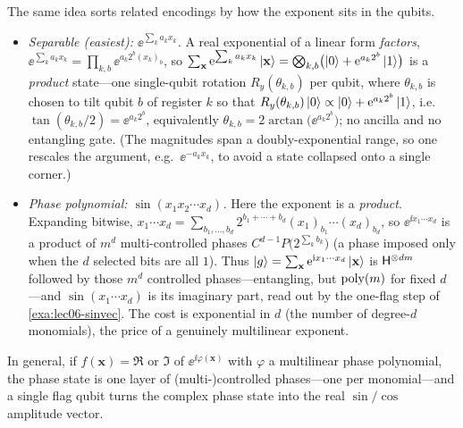 \begin{remark}
\label{rem:lec06-phasepoly}
The same idea sorts related encodings by how the exponent sits in the qubits.
\begin{itemize}[leftmargin=1.4em,nosep]
  \item \emph{Separable (easiest): $\ee^{\sum_k a_k x_k}$.} A real exponential of a
        linear form \emph{factors},
        $\ee^{\sum_k a_k x_k}=\prod_{k,b}\ee^{a_k 2^b (x_k)_b}$, so
        $\sum_{\mathbf x}\mathrm{e}^{\sum_k a_k x_k}\ket{\mathbf x}
        =\bigotimes_{k,b}\bigl(\ket0+\mathrm{e}^{a_k 2^b}\ket1\bigr)$ is a \emph{product}
        state---one single-qubit rotation $R_y(\theta_{k,b})$ per qubit, where
        $\theta_{k,b}$ is chosen to tilt qubit $b$ of register $k$ so that
        $R_y(\theta_{k,b})\ket0\propto\ket0+\mathrm{e}^{a_k 2^b}\ket1$, i.e.\
        $\tan(\theta_{k,b}/2)=\ee^{a_k 2^b}$, equivalently
        $\theta_{k,b}=2\arctan\!\bigl(\ee^{a_k 2^b}\bigr)$; no ancilla and no entangling
        gate. (The magnitudes span a
        doubly-exponential range, so one rescales the argument, e.g.\
        $\ee^{-a_k x_k}$, to avoid a state collapsed onto a single corner.)
  \item \emph{Phase polynomial: $\sin(x_1x_2\cdots x_d)$.} Here the exponent is a
        \emph{product}. Expanding bitwise,
        $x_1\cdots x_d=\sum_{b_1,\dots,b_d}2^{b_1+\cdots+b_d}(x_1)_{b_1}\cdots(x_d)_{b_d}$,
        so $\ee^{\ii x_1\cdots x_d}$ is a product of $m^d$ multi-controlled phases
        $C^{d-1}P\bigl(2^{\sum_k b_k}\bigr)$ (a phase imposed only when the $d$ selected
        bits are all $1$). Thus
        $\ket g=\sum_{\mathbf x}\mathrm{e}^{\mathrm{i} x_1\cdots x_d}\ket{\mathbf x}$ is
        $\mathsf{H}^{\otimes dm}$ followed by those $m^d$ controlled phases---entangling,
        but $\operatorname{poly}(m)$ for fixed $d$---and $\sin(x_1\cdots x_d)$ is its imaginary part,
        read out by the one-flag step of \cref{exa:lec06-sinvec}. The cost is
        exponential in $d$ (the number of degree-$d$ monomials), the price of a
        genuinely multilinear exponent.
\end{itemize}
In general, if $f(\mathbf x)=\Re$ or $\Im$ of $\ee^{\ii\varphi(\mathbf x)}$ with
$\varphi$ a multilinear phase polynomial, the phase state is one layer of
(multi-)controlled phases---one per monomial---and a single flag qubit turns the
complex phase state into the real $\sin/\cos$ amplitude vector.
\end{remark}

